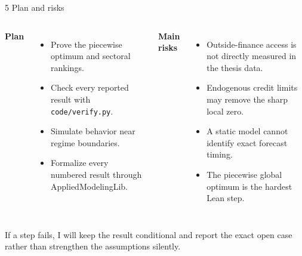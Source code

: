 \documentclass[aspectratio=169,11pt]{beamer}
\begin{document}
\begin{frame}{5 \textperiodcentered{} Plan and risks}
\begin{columns}[T,onlytextwidth]
  \textbf{Plan}
  \begin{itemize}
    \item Prove the piecewise optimum and sectoral rankings.
    \item Check every reported result with \texttt{code/verify.py}.
    \item Simulate behavior near regime boundaries.
    \item Formalize every numbered result through AppliedModelingLib.
  \end{itemize}

  \textbf{Main risks}
  \begin{itemize}
    \item Outside-finance access is not directly measured in the thesis data.
    \item Endogenous credit limits may remove the sharp local zero.
    \item A static model cannot identify exact forecast timing.
    \item The piecewise global optimum is the hardest Lean step.
  \end{itemize}
\end{columns}

\vfill
\small If a step fails, I will keep the result conditional and report the exact
open case rather than strengthen the assumptions silently.
\end{frame}
\end{document}
